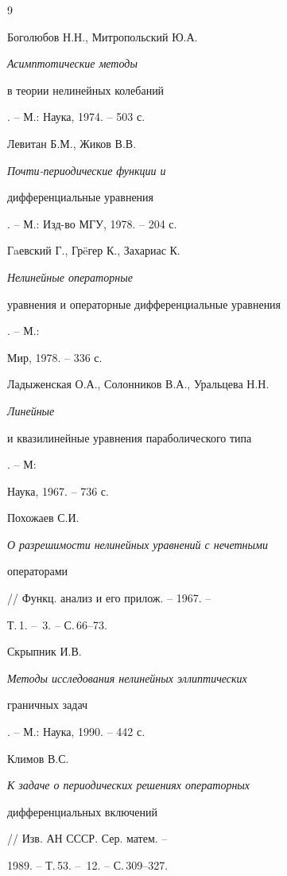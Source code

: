 \begin{thebibliography}{9} 


 




Боголюбов Н.Н., Митропольский Ю.А. {\em Асимптотические методы 


в теории нелинейных колебаний}. -- М.: Наука, 1974. -- 503 с. 




Левитан Б.М., Жиков В.В. {\em Почти-периодические функции и 


дифференциальные уравнения}. -- М.: Изд-во МГУ, 1978. -- 204 с. 




Гaевский Г., Гр\"eгер К., Захариас К. {\em Нелинейные операторные 


уравнения и операторные дифференциальные уравнения}. -- М.: 


Мир, 1978. -- 336 с. 










Ладыженская О.А., Солонников В.А., Уральцева Н.Н. {\em Линейные 


и квазилинейные уравнения параболического типа}. -- М: 


Наука, 1967. -- 736 с. 




Похожаев С.И. {\em О разрешимости нелинейных уравнений с нечетными 


операторами} // Функц. анализ и его прилож. -- 1967. -- 


Т.\,1. -- \No\,3. -- С.\,66--73. 




Скрыпник И.В. {\em Методы исследования нелинейных эллиптических 


граничных задач}. -- М.: Наука, 1990. -- 442 с. 




Климов В.С. {\em К задаче о периодических решениях операторных 


дифференциальных включений} // Изв. АН СССР. Сер. матем. -- 


1989. -- Т.\,53. -- \No\,12. -- С.\,309--327. 



\end{thebibliography}
